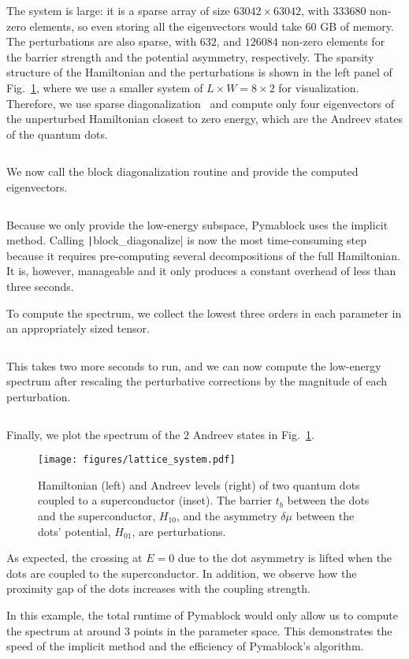 The system is large: it is a sparse array of size $63042 \times 63042$, with $333680$ non-zero elements, so even storing all the eigenvectors would take $60$ GB of memory.
The perturbations are also sparse, with $632$, and $126084$ non-zero elements for the barrier strength and the potential asymmetry, respectively.
The sparsity structure of the Hamiltonian and the perturbations is shown in the left panel of Fig.~\ref{fig:QD_spectrum}, where we use a smaller system of $L \times W = 8 \times 2$ for visualization.
Therefore, we use sparse diagonalization~\cite{Virtanen_2020} and compute only four eigenvectors of the unperturbed Hamiltonian closest to zero energy, which are the Andreev states of the quantum dots.
%
\inputminted[firstline=61, lastline=62]{python}{code_figures/lattice_system.py}
%
We now call the block diagonalization routine and provide the computed eigenvectors.
%
\inputminted[firstline=64, lastline=64]{python}{code_figures/lattice_system.py}
%
Because we only provide the low-energy subspace, Pymablock uses the implicit method.
Calling \texttt|block_diagonalize| is now the most time-consuming step because it requires pre-computing several decompositions of the full Hamiltonian.
It is, however, manageable and it only produces a constant overhead of less than three seconds.

To compute the spectrum, we collect the lowest three orders in each parameter in an appropriately sized tensor.
%
\inputminted[firstline=69, lastline=69]{python}{code_figures/lattice_system.py}
%
This takes two more seconds to run, and we can now compute the low-energy spectrum after rescaling the perturbative corrections by the magnitude of each perturbation.
%
\inputminted[firstline=72, lastline=77]{python}{code_figures/lattice_system.py}
%
Finally, we plot the spectrum of the $2$ Andreev states in Fig.~\ref{fig:QD_spectrum}.
%
\begin{figure}[h!]
\centering
\texttt{[image: figures/lattice\_system.pdf]}
\caption{
    Hamiltonian (left) and Andreev levels (right) of two quantum dots coupled to a superconductor (inset).
    The barrier $t_b$ between the dots and the superconductor, $H_{10}$, and the asymmetry $\delta \mu$ between the dots' potential, $H_{01}$, are perturbations.
}
\label{fig:QD_spectrum}
\end{figure}
%
As expected, the crossing at $E=0$ due to the dot asymmetry is lifted when the dots are coupled to the superconductor.
In addition, we observe how the proximity gap of the dots increases with the coupling strength.

In this example, the total runtime of Pymablock would only allow us to compute the spectrum at around $3$ points in the parameter space.
This demonstrates the speed of the implicit method and the efficiency of Pymablock's algorithm.
